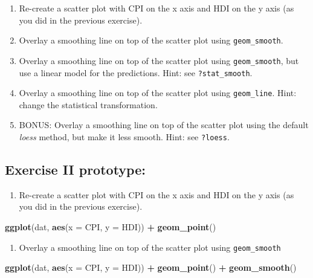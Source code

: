 \documentclass[]{book}
\newenvironment{Shaded}{\begin{snugshade}}{\end{snugshade}}
\newcommand{\KeywordTok}[1]{\textcolor[rgb]{0.13,0.29,0.53}{\textbf{#1}}}
\newcommand{\DataTypeTok}[1]{\textcolor[rgb]{0.13,0.29,0.53}{#1}}
\newcommand{\StringTok}[1]{\textcolor[rgb]{0.31,0.60,0.02}{#1}}
\newcommand{\OperatorTok}[1]{\textcolor[rgb]{0.81,0.36,0.00}{\textbf{#1}}}
\newcommand{\NormalTok}[1]{#1}
\providecommand{\tightlist}{%
  \setlength{\itemsep}{0pt}\setlength{\parskip}{0pt}}
\begin{document}
\begin{enumerate}
\def\labelenumi{\arabic{enumi}.}
\tightlist
\item
  Re-create a scatter plot with CPI on the x axis and HDI on the y axis
  (as you did in the previous exercise).
\item
  Overlay a smoothing line on top of the scatter plot using
  \texttt{geom\_smooth}.
\item
  Overlay a smoothing line on top of the scatter plot using
  \texttt{geom\_smooth}, but use a linear model for the predictions.
  Hint: see \texttt{?stat\_smooth}.
\item
  Overlay a smoothing line on top of the scatter plot using
  \texttt{geom\_line}. Hint: change the statistical transformation.
\item
  BONUS: Overlay a smoothing line on top of the scatter plot using the
  default \emph{loess} method, but make it less smooth. Hint: see
  \texttt{?loess}.
\end{enumerate}

\subsection{Exercise II prototype:}\label{exercise-ii-prototype}

\begin{enumerate}
\def\labelenumi{\arabic{enumi}.}
\tightlist
\item
  Re-create a scatter plot with CPI on the x axis and HDI on the y axis
  (as you did in the previous exercise).
\end{enumerate}

\begin{Shaded}
\begin{Highlighting}[]
\KeywordTok{ggplot}\NormalTok{(dat, }\KeywordTok{aes}\NormalTok{(}\DataTypeTok{x =}\NormalTok{ CPI, }\DataTypeTok{y =}\NormalTok{ HDI)) }\OperatorTok{+}
\StringTok{  }\KeywordTok{geom_point}\NormalTok{()}
\end{Highlighting}
\end{Shaded}

\begin{enumerate}
\def\labelenumi{\arabic{enumi}.}
\setcounter{enumi}{1}
\tightlist
\item
  Overlay a smoothing line on top of the scatter plot using
  \texttt{geom\_smooth}
\end{enumerate}

\begin{Shaded}
\begin{Highlighting}[]
\KeywordTok{ggplot}\NormalTok{(dat, }\KeywordTok{aes}\NormalTok{(}\DataTypeTok{x =}\NormalTok{ CPI, }\DataTypeTok{y =}\NormalTok{ HDI)) }\OperatorTok{+}
\StringTok{  }\KeywordTok{geom_point}\NormalTok{() }\OperatorTok{+}
\StringTok{  }\KeywordTok{geom_smooth}\NormalTok{()}
\end{Highlighting}
\end{Shaded}
\end{document}
